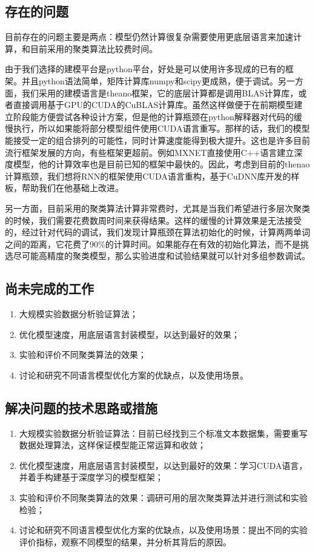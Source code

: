 \documentclass[twoside,UTF8,AutoFakeBold]{buaathesis}
\begin{document}
\subsection{存在的问题}
目前存在的问题主要是两点：模型仍然计算很复杂需要使用更底层语言来加速计算，和目前采用的聚类算法比较费时间。

由于我们选择的建模平台是python平台，好处是可以使用许多现成的已有的框架。并且python语法简单，矩阵计算库numpy和scipy更成熟，便于调试。另一方面，我们采用的建模语言是theano框架，它的底层计算都是调用BLAS计算库，或者直接调用基于GPU的CUDA的CuBLAS计算库。虽然这样做便于在前期模型建立阶段能方便尝试各种设计方案，但是他的计算瓶颈在python解释器对代码的缓慢执行，所以如果能将部分模型组件使用CUDA语言重写。那样的话，我们的模型能接受一定的组合排列的可能性，同时计算速度能得到极大提升。这也是许多目前流行框架发展的方向，有些框架更超前。例如MXNET直接使用C++语言建立深度模型，他的计算效率也是目前已知的框架中最快的。因此，考虑到目前的thenao计算瓶颈，我们想将RNN的框架使用CUDA语言重构，基于CuDNN库开发的样板，帮助我们在他基础上改进。

另一方面，目前采用的聚类算法计算非常费时，尤其是当我们希望进行多层次聚类的时候，我们需要花费数周时间来获得结果。这样的缓慢的计算效果是无法接受的，经过针对代码的调试，我们发现计算瓶颈在算法初始化的时候，计算两两单词之间的距离，它花费了90\%的计算时间。如果能存在有效的初始化算法，而不是挑选尽可能高精度的聚类模型，那么实验进度和试验结果就可以针对多组参数调试。
\subsection{尚未完成的工作}
\begin{enumerate}
\item 大规模实验数据分析验证算法；
\item 优化模型速度，用底层语言封装模型，以达到最好的效果；
\item 实验和评价不同聚类算法的效果；
\item 讨论和研究不同语言模型优化方案的优缺点，以及使用场景。
\end{enumerate}
\subsection{解决问题的技术思路或措施}
\begin{enumerate}
\item 大规模实验数据分析验证算法：目前已经找到三个标准文本数据集，需要重写数据处理算法，这样保证模型能正常运算和收敛；
\item 优化模型速度，用底层语言封装模型，以达到最好的效果：学习CUDA语言，并着手构建基于深度学习的模型框架；
\item 实验和评价不同聚类算法的效果：调研可用的层次聚类算法并进行测试和实验检验；
\item 讨论和研究不同语言模型优化方案的优缺点，以及使用场景：提出不同的实验评价指标，观察不同模型的结果，并分析其背后的原因。
\end{enumerate}
\end{document}
